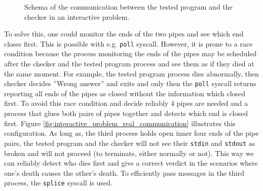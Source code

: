 \documentclass[en]{pracamgr}
\begin{document}
\begin{figure}[h]
\tikzset{>=latex} %
\centering
{}
\caption{Schema of the communication between the tested program and the checker in an interactive problem.}
\label{fig:intaractive_problem_communication_schema}
\end{figure}

To solve this, one could monitor the ends of the two pipes and see which end closes first. This is possible with e.g. \texttt{poll} syscall. However, it is prone to a race condition because the process monitoring the ends of the pipes may be scheduled after the checker and the tested program process and see them as if they died at the same moment. For example, the tested program process dies abnormally, then checker decides ''Wrong answer'' and exits and only then the \texttt{poll} syscall returns reporting all ends of the pipes as closed without the information which closed first. To avoid this race condition and decide reliably 4 pipes are needed and a process that glues both pairs of pipes together and detects which end is closed first. Figure \ref{fig:interactive_problem_real_communication} illustrates this configuration. As long as, the third process holds open inner four ends of the pipe pairs, the tested program and the checker will not see their \texttt{stdin} and \texttt{stdout} as broken and will not proceed (to terminate, either normally or not). This way we can reliably detect who dies first and give a correct verdict in the scenarios where one's death causes the other's death. To efficiently pass messages in the third process, the \texttt{splice} syscall is used.
\end{document}

